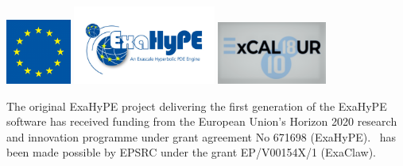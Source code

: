 \chapter{\ExaHyPE}
\label{section:exahype}


 \begin{center}
  \includegraphics[width=0.16\textwidth]{60_exahype/EU.png}
  \includegraphics[width=0.35\textwidth]{60_exahype/ExaHyPE_Logo.jpg}
  \includegraphics[width=0.27\textwidth]{60_exahype/ExCALIBUR.png}
 \end{center}
 { \footnotesize
   The original ExaHyPE project delivering the first generation of the ExaHyPE
   software has received funding from the European Union’s Horizon 2020 research
   and innovation programme under grant agreement No 671698 (ExaHyPE).
   \ExaHyPE\ has been made possible by EPSRC under the grant EP/V00154X/1
   (ExaClaw). 
 }


